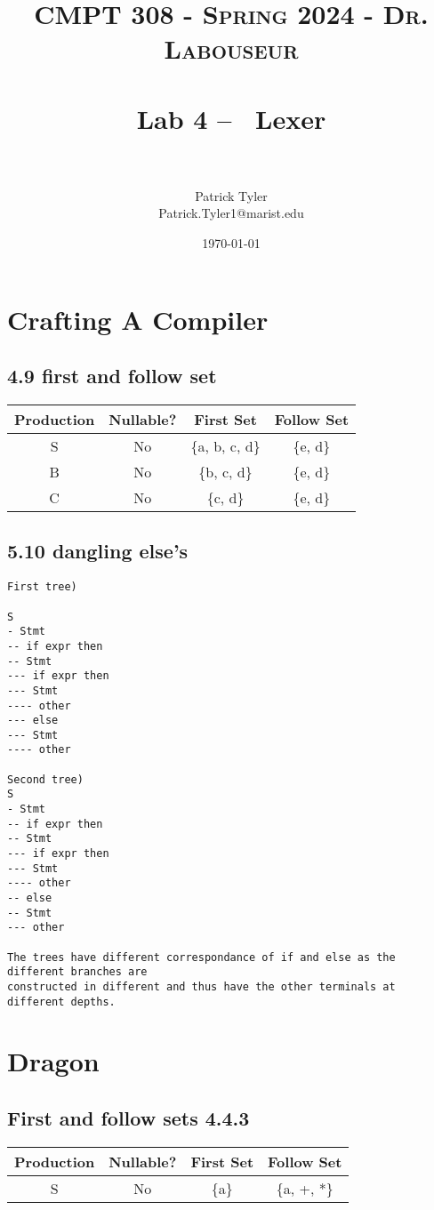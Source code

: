 \documentclass[letterpaper, 10pt]{article}
\title{	
   \normalfont \normalsize 
   \textsc{CMPT 308 - Spring 2024 - Dr. Labouseur} \\[10pt] %
   \horrule{0.5pt} \\[0.25cm] 	%
   \huge Lab 4 -- ~Lexer \\     	    %
   \horrule{0.5pt} \\[0.25cm] 	%
}
\author{Patrick Tyler \\ \normalsize Patrick.Tyler1@marist.edu}
\date{\normalsize\today} 	%
\begin{document}
\maketitle %


\section{Crafting A Compiler}
\subsection{4.9 first and follow set}
\begin{table}[h]
\begin{tabular}{|c|c|c|c|}
\hline
\textbf{Production} & \textbf{Nullable?} & \textbf{First Set} & \textbf{Follow Set} \\
\hline
    S & No & \{a, b, c, d\} & \{e, d\} \\
    B & No & \{b, c, d\} & \{e, d\} \\
    C & No & \{c, d\} & \{e, d\}\\
\hline
\end{tabular}
\end{table}
\newpage
\subsection{5.10 dangling else's}
\begin{verbatim}
First tree)

S
- Stmt
-- if expr then
-- Stmt
--- if expr then
--- Stmt
---- other
--- else
--- Stmt
---- other

Second tree)
S
- Stmt
-- if expr then
-- Stmt
--- if expr then
--- Stmt
---- other
-- else
-- Stmt
--- other

The trees have different correspondance of if and else as the different branches are 
constructed in different and thus have the other terminals at different depths.
\end{verbatim}

\section{Dragon}
\subsection{First and follow sets 4.4.3}
\begin{table}[h]
\begin{tabular}{|c|c|c|c|}
\hline
\textbf{Production} & \textbf{Nullable?} & \textbf{First Set} & \textbf{Follow Set} \\
\hline
    S & No & \{a\} & \{a, +, *\} \\
\hline
\end{tabular}
\end{table}
\end{document}
